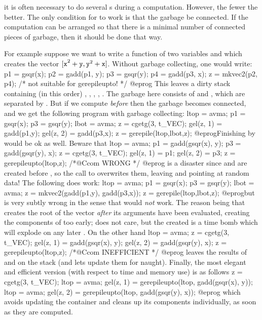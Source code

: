  it is often necessary to do several
s during a computation. However, the fewer the better. The only
condition for  to work is that the garbage be connected. If the
computation can be arranged so that there is a minimal number of connected
pieces of garbage, then it should be done that way.

For example suppose we want to write a function of two  variables
 and  which creates the vector ${\tt [x}^2+{\tt y},
{\tt y}^2+{\tt x]}$. Without garbage collecting, one would write:
%
\bprog
  p1 = gsqr(x); p2 = gadd(p1, y);
  p3 = gsqr(y); p4 = gadd(p3, x);
  z = mkvec2(p2, p4);  /* not suitable for gerepileupto! */
@eprog\noindent
This leaves a dirty stack containing (in this order) , ,
, , . The garbage here consists of  and
, which are separated by . But if we compute 
\emph{before}  then the garbage becomes connected, and we get the
following program with garbage collecting:
%
\bprog
  ltop = avma; p1 = gsqr(x); p3 = gsqr(y);
  lbot = avma; z = cgetg(3, t_VEC);
  gel(z, 1) = gadd(p1,y);
  gel(z, 2) = gadd(p3,x); z = gerepile(ltop,lbot,z);
@eprog\noindent Finishing by  would be ok as
well. Beware that
\bprog
  ltop = avma; p1 = gadd(gsqr(x), y); p3 = gadd(gsqr(y), x);
  z = cgetg(3, t_VEC);
  gel(z, 1) = p1;
  gel(z, 2) = p3; z = gerepileupto(ltop,z); /*@Ccom WRONG */
@eprog\noindent
is a disaster since  and  are created before
, so the call to  overwrites them, leaving
 and  pointing at random data! The following
does work:
\bprog
  ltop = avma; p1 = gsqr(x); p3 = gsqr(y);
  lbot = avma; z = mkvec2(gadd(p1,y), gadd(p3,x));
  z = gerepile(ltop,lbot,z);
@eprog\noindent but is very subtly wrong in the sense that
 would \emph{not} work. The reason being
that  creates the root  of the vector \emph{after}
its arguments have been evaluated, creating the components of 
too early;  does not care, but the created  is a time
bomb which will explode on any later .
On the other hand
\bprog
  ltop = avma; z = cgetg(3, t_VEC);
  gel(z, 1) = gadd(gsqr(x), y);
  gel(z, 2) = gadd(gsqr(y), x); z = gerepileupto(ltop,z); /*@Ccom INEFFICIENT */
@eprog\noindent
leaves the results of  and  on the stack (and
lets  update them for naught). Finally, the most elegant
and efficient version (with respect to time and memory use) is as follows
\bprog
  z = cgetg(3, t_VEC);
  ltop = avma; gel(z, 1) = gerepileupto(ltop, gadd(gsqr(x), y));
  ltop = avma; gel(z, 2) = gerepileupto(ltop, gadd(gsqr(y), x));
@eprog\noindent
which avoids updating the container  and cleans up its components
individually, as soon as they are computed.

